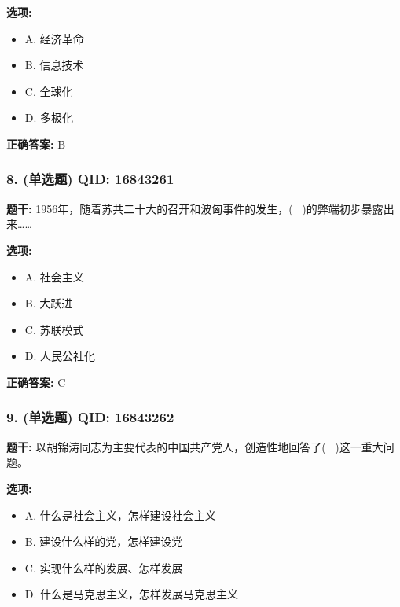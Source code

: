 \documentclass[12pt,UTF8]{ctexart}
\begin{document}
\textbf{选项:}
\begin{itemize}[leftmargin=*]

  \item A. 经济革命

  \item B. 信息技术

  \item C. 全球化

  \item D. 多极化

\end{itemize}

\textbf{正确答案:}
B

\vspace{0.3em}\hrulefill\vspace{0.7em}

\subsubsection*{8. (单选题) \small QID: 16843261}

\textbf{题干:}
1956年，随着苏共二十大的召开和波匈事件的发生，(  )的弊端初步暴露出来……

\textbf{选项:}
\begin{itemize}[leftmargin=*]

  \item A. 社会主义

  \item B. 大跃进

  \item C. 苏联模式

  \item D. 人民公社化

\end{itemize}

\textbf{正确答案:}
C

\vspace{0.3em}\hrulefill\vspace{0.7em}

\subsubsection*{9. (单选题) \small QID: 16843262}

\textbf{题干:}
以胡锦涛同志为主要代表的中国共产党人，创造性地回答了(  )这一重大问题。

\textbf{选项:}
\begin{itemize}[leftmargin=*]

  \item A. 什么是社会主义，怎样建设社会主义

  \item B. 建设什么样的党，怎样建设党

  \item C. 实现什么样的发展、怎样发展

  \item D. 什么是马克思主义，怎样发展马克思主义

\end{itemize}
\end{document}
